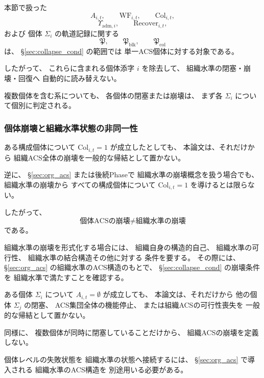 \begin{remark}
\label{rem:individual_level_failure_objects}
本節で扱った
\[
  A_{i,t},
  \qquad
  \mathrm{WF}_{i,t},
  \qquad
  \mathrm{Col}_{i,t},
\]
\[
  \Upsilon_{\mathrm{adm},i},
  \qquad
  \mathrm{Recover}_{i,t},
\]
および
個体 $\Sigma_i$ の軌道記録に関する
\[
  \mathfrak{P},
  \qquad
  \mathfrak{P}_{\mathrm{blk}},
  \qquad
  \mathfrak{P}_{\mathrm{col}}
\]
は、
\S\ref{sec:collapse_cond} の範囲では
単一ACS個体に対する対象である。

したがって、
これらに含まれる個体添字 $i$ を除去して、
組織水準の閉塞・崩壊・回復へ
自動的に読み替えない。

複数個体を含む系についても、
各個体の閉塞または崩壊は、
まず各
$\Sigma_i$
について個別に判定される。
\end{remark}

\subsubsection{個体崩壊と組織水準状態の非同一性}

\begin{remark}[個体の崩壊と組織ACSの崩壊を同一視しない]
\label{rem:individual_vs_org_collapse}
ある構成個体について
$\mathrm{Col}_{i,t}=1$
が成立したとしても、
本論文は、それだけから
組織ACS全体の崩壊を一般的な帰結として置かない。

逆に、
\S\ref{sec:org_acs}
または後続Phaseで
組織水準の崩壊概念を扱う場合でも、
組織水準の崩壊から
すべての構成個体について
$\mathrm{Col}_{i,t}=1$
を導けるとは限らない。

したがって、
\[
  \text{個体ACSの崩壊}
  \neq
  \text{組織水準の崩壊}
\]
である。

組織水準の崩壊を形式化する場合には、
組織自身の構造的自己、
組織水準の可行性、
組織水準の結合構造その他に対する
条件を要する。
その際には、
\S\ref{sec:org_acs} の組織水準のACS構造のもとで、
\S\ref{sec:collapse_cond} の崩壊条件を
組織水準で満たすことを確認する。
\end{remark}

\begin{remark}[個体閉塞と組織水準可行性を同一視しない]
\label{rem:individual_blockage_org_viability}
ある個体
$\Sigma_i$
について
$A_{i,t}=\emptyset$
が成立しても、
本論文は、それだけから
他の個体
$\Sigma_j$
の閉塞、
ACS集団全体の機能停止、
または組織ACSの可行性喪失を
一般的な帰結として置かない。

同様に、
複数個体が同時に閉塞していることだけから、
組織ACSの崩壊を定義しない。

個体レベルの失敗状態を
組織水準の状態へ接続するには、
\S\ref{sec:org_acs}
で導入される
組織水準のACS構造を
別途用いる必要がある。
\end{remark}

